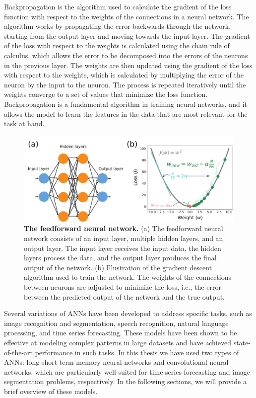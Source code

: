 Backpropagation is the algorithm used to calculate the gradient of the loss
function with respect to the weights of the connections in a neural network.
The algorithm works by propagating the error backwards through the network,
starting from the output layer and moving towards the input layer. The
gradient of the loss with respect to the weights is calculated using the
chain
rule of calculus, which allows the error to be decomposed into the errors of
the neurons in the previous layer. The weights are then updated using the
gradient of the loss with respect to the weights, which is calculated by
multiplying the error of the neuron by the input to the neuron. The process
is
repeated iteratively until the weights converge to a set of values that
minimize the loss function. Backpropagation is a fundamental algorithm in
training neural networks, and it allows the model to learn the features in
the
data that are most relevant for the task at hand.

\begin{figure}[H]
  \centering
  \includegraphics[width=1\textwidth]{Figures/ANN.pdf}
  \caption[The feedforward neural network]{
    \textbf{The feedforward neural network.} (a) The feedforward neural
    network
    consists of an input layer, multiple hidden layers, and an output layer.
    The input layer receives the input data, the hidden layers process the
    data, and the output layer produces the final output of the network.
    (b) Illustration of the gradient descent algorithm used to train the
    network. The weights of the connections between neurons are adjusted to
    minimize the loss, i.e., the error between the predicted output of the
    network and the true output.}
  \label{fig:ANN}
\end{figure}

Several variations of ANNs have been developed to address specific tasks, such
as image recognition and segmentation, speech recognition, natural language
processing, and time series forecasting. These models have been shown to be
effective at modeling complex patterns in large datasets and have achieved
state-of-the-art performance in such tasks. In this thesis we have used two
types of ANNs: long-short-term memory neural networks and convolutional neural
networks, which are particularly well-suited for time series forecasting and
image segmentation problems, respectively. In the following sections, we will
provide a brief overview of these models.


